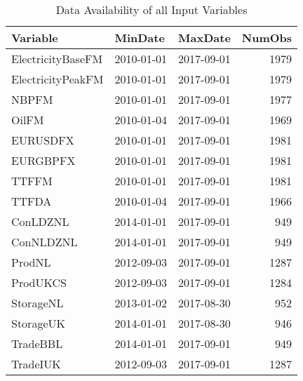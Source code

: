 \begin{table}[ht]
\centering
\begin{tabular}{lllr}
  \hline
Variable & MinDate & MaxDate & NumObs \\ 
  \hline
ElectricityBaseFM & 2010-01-01 & 2017-09-01 & 1979 \\ 
  ElectricityPeakFM & 2010-01-01 & 2017-09-01 & 1979 \\ 
  NBPFM & 2010-01-01 & 2017-09-01 & 1977 \\ 
  OilFM & 2010-01-04 & 2017-09-01 & 1969 \\ 
  EURUSDFX & 2010-01-01 & 2017-09-01 & 1981 \\ 
  EURGBPFX & 2010-01-01 & 2017-09-01 & 1981 \\ 
  TTFFM & 2010-01-01 & 2017-09-01 & 1981 \\ 
  TTFDA & 2010-01-04 & 2017-09-01 & 1966 \\ 
  ConLDZNL & 2014-01-01 & 2017-09-01 & 949 \\ 
  ConNLDZNL & 2014-01-01 & 2017-09-01 & 949 \\ 
  ProdNL & 2012-09-03 & 2017-09-01 & 1287 \\ 
  ProdUKCS & 2012-09-03 & 2017-09-01 & 1284 \\ 
  StorageNL & 2013-01-02 & 2017-08-30 & 952 \\ 
  StorageUK & 2014-01-01 & 2017-08-30 & 946 \\ 
  TradeBBL & 2014-01-01 & 2017-09-01 & 949 \\ 
  TradeIUK & 2012-09-03 & 2017-09-01 & 1287 \\ 
   \hline
\end{tabular}
\caption{Data Availability of all Input Variables} 
\label{tab:data-availability}
\end{table}

